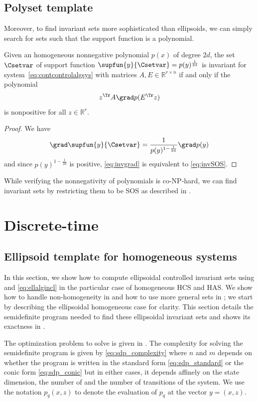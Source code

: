 \documentclass[11pt,twoside,a4paper,openright]{uclouvain-thesis}
\newcommand{\dtahcs}{HCS}
\newcommand{\dtahas}{HAS}
\begin{document}
\subsection{Polyset template}
Moreover, to find invariant sets more sophisticated than ellipsoids, we can simply
search for sets such that the support function is a polynomial.
\begin{mycoro}
  Given an homogeneous nonnegative polynomial $p(x)$ of degree $2d$, the set $\Csetvar$ of support function
  $\supfun{y}{\Csetvar} = p(y)^{\frac{1}{2d}}$
  is invariant for system~\eqref{eq:contcontrolalgsys}
  with matrices $A, E \in \mathbb{R}^{r \times n}$
  if and only if the polynomial
  \begin{equation}
    \label{eq:invSOS}
    z^\Tr A \grad p(E^\Tr z)
  \end{equation}
  is nonpositive for all $z \in \mathbb{R}^r$.
  \begin{proof}
    We have
    \[
      \grad \supfun{y}{\Csetvar} = \frac{1}{p(y)^{1-\frac{1}{2d}}} \grad p(y)
    \]
    and since $p(y)^{1-\frac{1}{2d}}$ is positive,
    \eqref{eq:invgrad} is equivalent to \eqref{eq:invSOS}.
  \end{proof}
\end{mycoro}
While verifying the nonnegativity of polynomials is co-NP-hard,
we can find invariant sets by restricting them to be SOS as described in .


\section{Discrete-time}
\label{sec:mci_discrete}



\subsection{Ellipsoid template for homogeneous systems}
\label{sec:hellipsoids}
In this section, we show how to compute ellipsoidal controlled invariant sets using  and \eqref{eq:ellalgincl} in the particular case of homogeneous \dtahcs{} and \dtahas{}.
We show how to handle non-homogeneity in  and how to use more general sets in ;
we start by describing the ellipsoidal homogeneous case for clarity.
This section details the semidefinite program needed to find these ellipsoidal invariant sets and shows its exactness in .

The optimization problem to solve is given in .
The complexity for solving the semidefinite program is given by \eqref{eq:sdp_complexity}
where $n$ and $m$ depends on whether the program is written in the standard form \eqref{eq:sdp_standard} or the conic form \eqref{eq:sdp_conic} but in either cases, it depends affinely on the state dimension, the number of \nodes{} and the number of transitions of the system.
We use the notation $p_q(x, z)$ to denote the evaluation of $p_q$ at the vector $y = (x, z)$.
\end{document}
